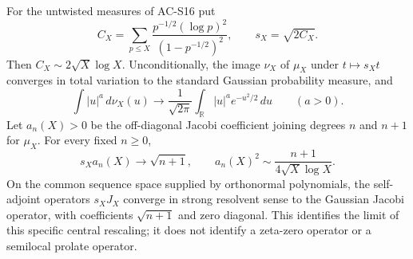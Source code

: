 \begin{theorem}
\label{AC-S21}
For the untwisted measures of AC-S16 put
\[
 C_X=\sum_{p\leq X}
       \frac{p^{-1/2}(\log p)^2}{(1-p^{-1/2})^2},
 \qquad s_X=\sqrt{2C_X}.
\]
Then \(C_X\sim2\sqrt X\log X\).  Unconditionally, the image
\(\nu_X\) of \(\mu_X\) under \(t\mapsto s_Xt\) converges in
total variation to the standard Gaussian probability measure, and
\[
 \int |u|^a\,d\nu_X(u)\longrightarrow
 \frac1{\sqrt{2\pi}}\int_{\mathbb R}|u|^ae^{-u^2/2}\,du
 \qquad(a>0).
\]
Let \(a_n(X)>0\) be the off-diagonal Jacobi coefficient joining
degrees \(n\) and \(n+1\) for \(\mu_X\).  For every fixed \(n\geq0\),
\[
 s_Xa_n(X)\longrightarrow\sqrt{n+1},
 \qquad
 a_n(X)^2\sim\frac{n+1}{4\sqrt X\log X}.
\]
On the common sequence space supplied by orthonormal polynomials,
the self-adjoint operators \(s_XJ_X\) converge in strong resolvent
sense to the Gaussian Jacobi operator, with coefficients
\(\sqrt{n+1}\) and zero diagonal.  This identifies the limit of this
specific central rescaling; it does not identify a zeta-zero
operator or a semilocal prolate operator.
\end{theorem}
